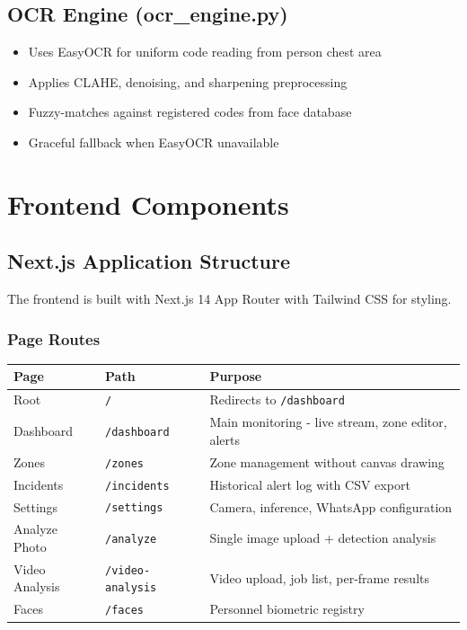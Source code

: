\documentclass[12pt,a4paper,oneside]{book}
\begin{document}
\section{OCR Engine (ocr\_engine.py)}

\begin{itemize}
    \item Uses EasyOCR for uniform code reading from person chest area
    \item Applies CLAHE, denoising, and sharpening preprocessing
    \item Fuzzy-matches against registered codes from face database
    \item Graceful fallback when EasyOCR unavailable
\end{itemize}

\chapter{Frontend Components}

\section{Next.js Application Structure}

The frontend is built with Next.js 14 App Router with Tailwind CSS for styling.

\subsection{Page Routes}

\begin{longtable}{|l|l|p{8cm}|}
    \hline
    \textbf{Page} & \textbf{Path} & \textbf{Purpose} \\
    \hline
    Root & \texttt{/} & Redirects to \texttt{/dashboard} \\
    \hline
    Dashboard & \texttt{/dashboard} & Main monitoring - live stream, zone editor, alerts \\
    \hline
    Zones & \texttt{/zones} & Zone management without canvas drawing \\
    \hline
    Incidents & \texttt{/incidents} & Historical alert log with CSV export \\
    \hline
    Settings & \texttt{/settings} & Camera, inference, WhatsApp configuration \\
    \hline
    Analyze Photo & \texttt{/analyze} & Single image upload + detection analysis \\
    \hline
    Video Analysis & \texttt{/video-analysis} & Video upload, job list, per-frame results \\
    \hline
    Faces & \texttt{/faces} & Personnel biometric registry \\
    \hline
\end{longtable}
\end{document}
